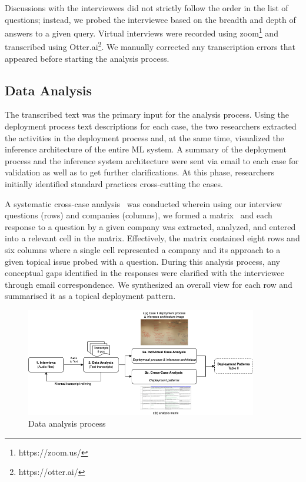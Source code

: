 Discussions with the interviewees did not strictly follow the order in the list of questions; instead, we probed the interviewee based on the breadth and depth of answers to a given query. Virtual interviews were recorded using zoom\footnote{https://zoom.us/} and transcribed using Otter.ai\footnote{https://otter.ai/}. We manually corrected any transcription errors that appeared before starting the analysis process.

 
\subsection{Data Analysis}
The transcribed text was the primary input for the analysis process. Using the deployment process text descriptions for each case, the two researchers extracted the activities in the deployment process and, at the same time, visualized the inference architecture of the entire ML system. A summary of the deployment process and the inference system architecture were sent via email to each case for validation as well as to get further clarifications. At this phase, researchers initially identified standard practices cross-cutting the cases. 

A systematic cross-case analysis~\cite{seaman1999qualitative} was conducted wherein using our interview questions (rows) and companies (columns), we formed a matrix~\cite{webster2002analyzing} and each response to a question by a given company was extracted, analyzed, and entered into a relevant cell in the matrix. Effectively, the matrix contained eight rows and six columns where a single cell represented a company and its approach to a given topical issue probed with a question. During this analysis process, any conceptual gaps identified in the responses were clarified with the interviewee through email correspondence. We synthesized an overall view for each row and summarised it as a topical deployment pattern.



\begin{figure}[h]
\centering
\includegraphics[width=0.9\textwidth]{images/data_analysis_process.png}
\caption{Data analysis process}
\label{fig: data analysis process}
\end{figure}


